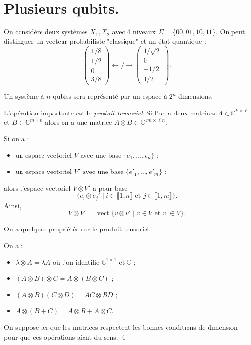 \documentclass[./main]{subfiles}
\begin{document}
  \section{Plusieurs qubits.}

  On considère deux systèmes $X_1, X_2$ avec $4$ niveaux $\Sigma = \{00, 01, 10, 11\}$.
  On peut distinguer un vecteur probabiliste "classique" et un état quantique :
  \[
  \begin{pmatrix} 1 / 8 \\ 1 / 2 \\ 0 \\ 3 / 8 \end{pmatrix} \gets\!\!/\!\!\to
  \begin{pmatrix} 1 / \sqrt{2} \\ 0 \\ - 1 / 2 \\ 1 / 2 \end{pmatrix} 
  .\]

  Un système à $n$ qubits sera représenté par un espace à $2^n$ dimensions.

  L'opération importante est le \textit{produit tensoriel}.
  Si l'on a deux matrices $A \in \mathds{C}^{k \times \ell}$ et $B \in \mathds{C}^{m \times n}$ alors on a une matrice $A \otimes B \in \mathds{C}^{km \times \ell n}$.

  \begin{defn}
    Si on a :
    \begin{itemize}
      \item un espace vectoriel $V$ avec une base $\{e_1, \ldots, e_n\}$ ;
      \item un espace vectoriel $V'$ avec une base $\{e'_1, \ldots, e'_m\}$ ;
    \end{itemize}
    alors l'espace vectoriel $V \otimes V'$ a pour base  \[
    \{e_i \otimes e_j'  \mid i \in \llbracket 1, n\rrbracket \text{ et } j \in \llbracket 1, m\rrbracket \} 
    .\]
    Ainsi, \[
      V \otimes V' = \operatorname{vect} \{v \otimes v'  \mid v \in V \text{ et } v' \in V\} 
    .\] 
  \end{defn}

  On a quelques propriétés sur le produit tensoriel.

  \begin{prop}
    On a :
    \begin{itemize}
      \item $\lambda \otimes A = \lambda A$ où l'on identifie $\mathds{C}^{1 \times 1}$ et $\mathds{C}$ ;
      \item $(A \otimes B) \otimes C = A \otimes (B \otimes C)$ ;
      \item  $(A \otimes B)(C \otimes D) = AC \otimes BD$ ;
      \item  $A \otimes (B + C) = A \otimes B + A \otimes C$.
    \end{itemize}
    On suppose ici que les matrices respectent les bonnes conditions de dimension pour que ces opérations aient du sens.
    \qed
  \end{prop}
\end{document}
